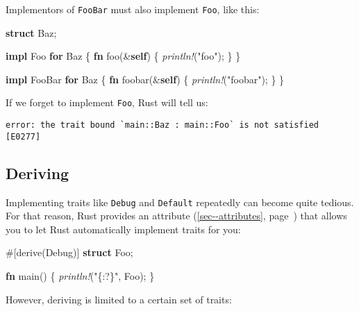 \documentclass[a4paper,]{book}
\renewcommand*{\hyperlink}[2]{%
 #2 (\autoref{#1}, page~\pageref{#1})}
\newenvironment{Shaded}{\begin{snugshade}}{\end{snugshade}}
\newcommand{\KeywordTok}[1]{\textcolor[rgb]{0.13,0.29,0.53}{\textbf{{#1}}}}
\newcommand{\StringTok}[1]{\textcolor[rgb]{0.31,0.60,0.02}{{#1}}}
\newcommand{\BuiltInTok}[1]{{#1}}
\newcommand{\PreprocessorTok}[1]{\textcolor[rgb]{0.56,0.35,0.01}{\textit{{#1}}}}
\newcommand{\AttributeTok}[1]{\textcolor[rgb]{0.77,0.63,0.00}{{#1}}}
\newcommand{\NormalTok}[1]{{#1}}
\begin{document}
Implementors of \texttt{FooBar} must also implement \texttt{Foo}, like
this:

\begin{Shaded}
\begin{Highlighting}[]
\KeywordTok{struct} \NormalTok{Baz;}

\KeywordTok{impl} \NormalTok{Foo }\KeywordTok{for} \NormalTok{Baz \{}
    \KeywordTok{fn} \NormalTok{foo(&}\KeywordTok{self}\NormalTok{) \{ }\PreprocessorTok{println!}\NormalTok{(}\StringTok{"foo"}\NormalTok{); \}}
\NormalTok{\}}

\KeywordTok{impl} \NormalTok{FooBar }\KeywordTok{for} \NormalTok{Baz \{}
    \KeywordTok{fn} \NormalTok{foobar(&}\KeywordTok{self}\NormalTok{) \{ }\PreprocessorTok{println!}\NormalTok{(}\StringTok{"foobar"}\NormalTok{); \}}
\NormalTok{\}}
\end{Highlighting}
\end{Shaded}

If we forget to implement \texttt{Foo}, Rust will tell us:

\begin{verbatim}
error: the trait bound `main::Baz : main::Foo` is not satisfied [E0277]
\end{verbatim}

\subsection{Deriving}\label{deriving}

Implementing traits like \texttt{Debug} and \texttt{Default} repeatedly
can become quite tedious. For that reason, Rust provides an
\protect\hyperlink{sec--attributes}{attribute} that allows you to let
Rust automatically implement traits for you:

\begin{Shaded}
\begin{Highlighting}[]
\AttributeTok{#[}\NormalTok{derive}\AttributeTok{(}\BuiltInTok{Debug}\AttributeTok{)]}
\KeywordTok{struct} \NormalTok{Foo;}

\KeywordTok{fn} \NormalTok{main() \{}
    \PreprocessorTok{println!}\NormalTok{(}\StringTok{"\{:?\}"}\NormalTok{, Foo);}
\NormalTok{\}}
\end{Highlighting}
\end{Shaded}

However, deriving is limited to a certain set of traits:
\end{document}
